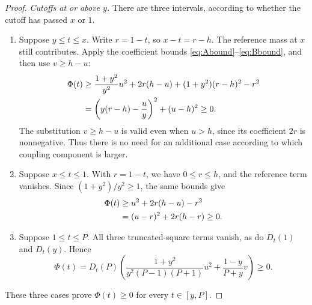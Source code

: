 \documentclass[11pt]{article}
\numberwithin{equation}{section}
\begin{document}
\begin{proof}
\smallskip
\noindent\emph{Cutoffs at or above $y$.}
There are three intervals, according to whether the cutoff has
passed $x$ or $1$.
\begin{enumerate}[label=(\roman*)]
\item Suppose $y\le t\le x$. Write $r=1-t$, so $x-t=r-h$. The reference
mass at $x$ still contributes. Apply the coefficient bounds
\eqref{eq:Abound}--\eqref{eq:Bbound}, and then use $v\ge h-u$:
\begin{align}\label{eq:middlesquares}
 \Phi(t)&\ge\frac{1+y^2}{y^2}u^2+2r(h-u)+(1+y^2)(r-h)^2-r^2\notag\\
 &=\left(y(r-h)-\frac uy\right)^2+(u-h)^2\ge0.
\end{align}
The substitution $v\ge h-u$ is valid even when $u>h$, since its
coefficient $2r$ is nonnegative. Thus there is no need for an
additional case according to which coupling component is larger.
\item Suppose $x\le t\le1$. With $r=1-t$, we have $0\le r\le h$,
and the reference term vanishes. Since $(1+y^2)/y^2\ge1$,
the same bounds give
\begin{align}\label{eq:uppersquare}
 \Phi(t)&\ge u^2+2r(h-u)-r^2\notag\\
 &=(u-r)^2+2r(h-r)\ge0.
\end{align}
\item Suppose $1\le t\le P$. All three truncated-square terms
vanish, as do $D_t(1)$ and $D_t(y)$. Hence
\[
 \Phi(t)=D_t(P)\left(
  \frac{1+y^2}{y^2(P-1)(P+1)}u^2
   +\frac{1-y}{P+y}v\right)\ge0.
\]
\end{enumerate}
These three cases prove $\Phi(t)\ge0$ for every $t\in[y,P]$.


\end{proof}
\end{document}
